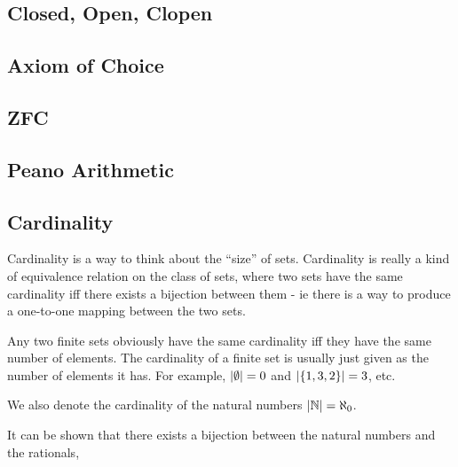 \subsection{Closed, Open, Clopen}

\subsection{Axiom of Choice}

\subsection{ZFC}

\subsection{Peano Arithmetic}

\subsection{Cardinality}


Cardinality is a way to think about the ``size'' of sets. Cardinality is
really a kind of equivalence relation on the class of sets, where two sets
have the same cardinality iff there exists a bijection between them - ie
there is a way to produce a one-to-one mapping between the two sets.

Any two finite sets obviously have the same cardinality iff they have the
same number of elements. The cardinality of a finite set is usually just
given as the number of elements it has. For example, \(\abs{\emptyset} = 0\)
and \(\abs{\{1, 3, 2\}} = 3\), etc.

We also denote the cardinality of the natural numbers
\(\abs{\mathbb N} = \aleph_0\).

It can be shown that there exists a bijection between the natural numbers and
the rationals,
